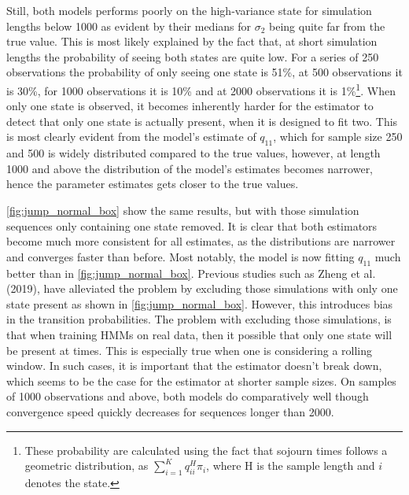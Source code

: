 Still, both models performs poorly on the high-variance state for simulation lengths below 1000 as evident by their medians for $\sigma_2$ being quite far from the true value. This is most likely explained by the fact that, at short simulation lengths the probability of seeing both states are quite low. For a series of 250 observations the probability of only seeing one state is 51\%, at 500 observations it is 30\%, for 1000 observations it is 10\% and at 2000 observations it is 1\%\footnote
{These probability are calculated using the fact that sojourn times follows a geometric distribution, as $\sum_{i=1}^K q_{ii}^H\pi_i$, where H is the sample length and $i$ denotes the state.
}. 
When only one state is observed, it becomes inherently harder for the estimator to detect that only one state is actually present, when it is designed to fit two. This is most clearly evident from the \mle model's estimate of $q_{11}$, which for sample size 250 and 500 is widely distributed compared to the true values, however, at length 1000 and above the distribution of the model's estimates becomes narrower, hence the parameter estimates gets closer to the true values.

\cref{fig:jump_normal_box} show the same results, but with those simulation sequences only containing one state removed. It is clear that both estimators become much more consistent for all estimates, as the distributions are narrower and converges faster than before. Most notably, the \mle model is now fitting $q_{11}$ much better than in \cref{fig:jump_normal_box}. Previous studies such as Zheng et al. (2019), have alleviated the problem by excluding those simulations with only one state present as shown in \cref{fig:jump_normal_box}. However, this introduces bias in the transition probabilities. The problem with excluding those simulations, is that when training HMMs on real data, then it possible that only one state will be present at times. This is especially true when one is considering a rolling window. In such cases, it is important that the estimator doesn't break down, which seems to be the case for the \mle estimator at shorter sample sizes. On samples of 1000 observations and above, both models do comparatively well though convergence speed quickly decreases for sequences longer than 2000.

